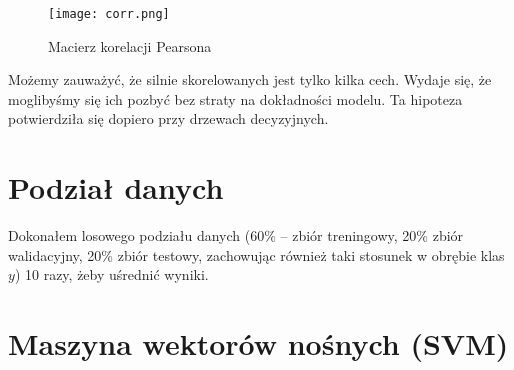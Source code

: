 \documentclass[a4paper,12pt]{article}
\begin{document}
\begin{figure}[H]
    \centering
    \texttt{[image: corr.png]} 
    \caption{Macierz korelacji Pearsona}
    \label{fig:corr}
\end{figure}

\!\!\!\!\!\!\!\!\!Możemy zauważyć, że silnie skorelowanych jest tylko kilka cech. Wydaje się, że moglibyśmy się ich pozbyć bez straty na dokładności modelu. Ta hipoteza potwierdziła się dopiero przy drzewach decyzyjnych.

\section{Podział danych}
Dokonałem losowego podziału danych (60\% -- zbiór treningowy, 20\% zbiór walidacyjny, 20\% zbiór testowy, zachowując również taki stosunek w obrębie klas $y$) 10 razy, żeby uśrednić wyniki.

\section{Maszyna wektorów nośnych (SVM)}
\end{document}
